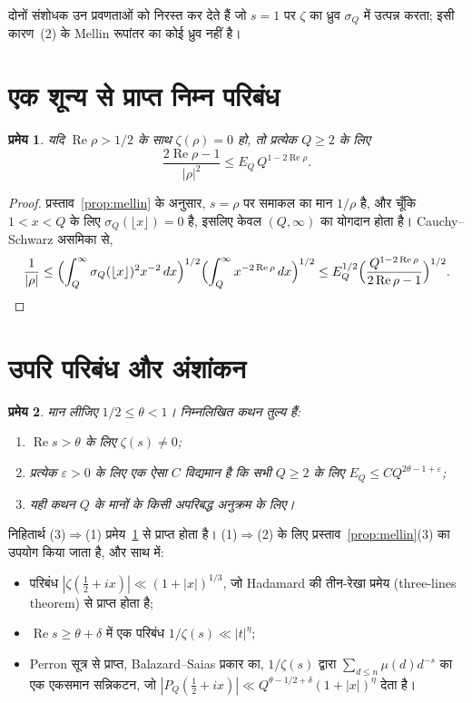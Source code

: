 \documentclass[11pt,a4paper]{amsart}
\newtheorem{teorema}{प्रमेय}
\theoremstyle{definition}
\theoremstyle{remark}
\renewcommand{\Re}{\operatorname{Re}}
\begin{document}
दोनों संशोधक उन प्रवणताओं को निरस्त कर देते हैं जो $s=1$ पर $\zeta$ का ध्रुव $\sigma_Q$ में उत्पन्न करता; इसी कारण~(2) के Mellin रूपांतर का कोई ध्रुव नहीं है।

\section{एक शून्य से प्राप्त निम्न परिबंध}

\begin{teorema}\label{teo:recip}
यदि $\Re\rho>1/2$ के साथ $\zeta(\rho)=0$ हो, तो प्रत्येक $Q\ge2$ के लिए
\[
\frac{2\Re\rho-1}{|\rho|^2}\le E_Q\,Q^{1-2\Re\rho}.
\]
\end{teorema}

\begin{proof}
प्रस्ताव~\ref{prop:mellin} के अनुसार, $s=\rho$ पर समाकल का मान $1/\rho$ है, और चूँकि $1<x<Q$ के लिए $\sigma_Q(\lfloor x\rfloor)=0$ है, इसलिए केवल $(Q,\infty)$ का योगदान होता है। Cauchy--Schwarz असमिका से,
\[
\frac1{|\rho|}\le\Bigl(\int_Q^\infty\sigma_Q(\lfloor x\rfloor)^2x^{-2}\,dx\Bigr)^{1/2}\Bigl(\int_Q^\infty x^{-2\Re\rho}\,dx\Bigr)^{1/2}
\le E_Q^{1/2}\Bigl(\frac{Q^{1-2\Re\rho}}{2\Re\rho-1}\Bigr)^{1/2}.\qedhere
\]
\end{proof}

\section{उपरि परिबंध और अंशांकन}\label{sec:cotas}

\begin{teorema}\label{teo:theta}
मान लीजिए $1/2\le\theta<1$। निम्नलिखित कथन तुल्य हैं:
\begin{enumerate}
\item $\Re s>\theta$ के लिए $\zeta(s)\ne0$;
\item प्रत्येक $\varepsilon>0$ के लिए एक ऐसा $C$ विद्यमान है कि सभी $Q\ge2$ के लिए $E_Q\le CQ^{2\theta-1+\varepsilon}$;
\item यही कथन $Q$ के मानों के किसी अपरिबद्ध अनुक्रम के लिए।
\end{enumerate}
\end{teorema}

निहितार्थ (3)$\Rightarrow$(1) प्रमेय~\ref{teo:recip} से प्राप्त होता है। (1)$\Rightarrow$(2) के लिए प्रस्ताव~\ref{prop:mellin}(3) का उपयोग किया जाता है, और साथ में:
\begin{itemize}
\item परिबंध $|\zeta(\tfrac12+ix)|\ll(1+|x|)^{1/3}$, जो Hadamard की तीन-रेखा प्रमेय (three-lines theorem) से प्राप्त होता है;
\item $\Re s\ge\theta+\delta$ में एक परिबंध $1/\zeta(s)\ll|t|^\eta$;
\item Perron सूत्र से प्राप्त, Balazard--Saias प्रकार का, $1/\zeta(s)$ द्वारा $\sum_{d\le n}\mu(d)d^{-s}$ का एक एकसमान सन्निकटन, जो $|P_Q(\tfrac12+ix)|\ll Q^{\theta-1/2+\delta}(1+|x|)^\eta$ देता है।
\end{itemize}
\end{document}
